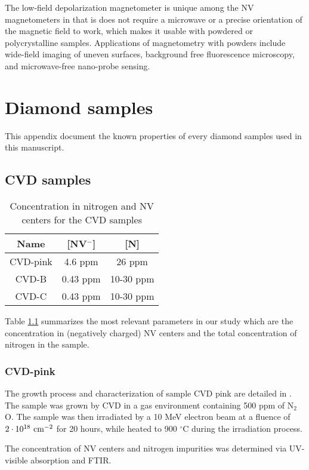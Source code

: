 \documentclass[a4paper, 11pt]{book}
\begin{document}
The low-field depolarization magnetometer is unique among the NV magnetometers in that is does not require a microwave or a precise orientation of the magnetic field to work, which makes it usable with powdered or polycrystalline samples. Applications of magnetometry with powders include wide-field imaging of uneven surfaces, background free fluorescence microscopy, and microwave-free nano-probe sensing.


\appendix
 
\chapter{Diamond samples}
\label{Appendix samples}
This appendix document the known properties of every diamond samples used in this manuscript.

\section{CVD samples}
\begin{table}[htbp]
\centering
\caption{Concentration in nitrogen and NV centers for the CVD samples}
\label{Table samples CVD}
\begin{tabular}{c|cc}
\toprule
Name &  [NV$^-$]  & [N] \\
\midrule
CVD-pink & 4.6 ppm & 26 ppm \\
CVD-B & 0.43 ppm & 10-30 ppm \\
CVD-C & 0.43 ppm & 10-30 ppm \\

\bottomrule
\end{tabular}
\end{table}
Table \ref{Table samples CVD} summarizes the most relevant parameters in our study which are the concentration in (negatively charged) NV centers and the total concentration of nitrogen in the sample.
\subsection{CVD-pink}
The growth process and characterization of sample CVD pink are detailed in \citep{tallaire2020high}. The sample was grown by CVD in a gas environment containing 500 ppm of N$_2$O. The sample was then irradiated by a 10 MeV electron beam at a fluence of $2\cdot 10^{18}\ \rm cm^{-2}$ for 20 hours, while heated to 900 $^\circ$C during the irradiation process.

The concentration of NV centers and nitrogen impurities was determined via UV-visible absorption and FTIR.
\end{document}
